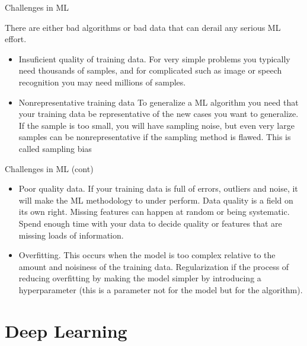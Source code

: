 \documentclass[11pt, aspectratio=43]{beamer}
\begin{document}
\begin{frame}{Challenges in ML}

	There are either bad algorithms or bad data that can derail any serious ML effort.
	\begin{itemize}
		\item Insuficient quality of training data.
		For very simple problems you typically need thousands of samples, and for complicated such as image or speech recognition you may need millions of samples.
		
		\item Nonrepresentative training data
		To generalize a ML algorithm you need that your training data be representative of the new cases you want to generalize. If the sample is too small, you will have sampling noise, but even very large samples can be nonrepresentative if the sampling method is flawed. This is called sampling bias
	\end{itemize}
	
\end{frame}

\begin{frame}{Challenges in ML (cont)}
	
	\begin{itemize}
		\item 	Poor quality data.
		If your training data is full of errors, outliers and noise, it will make the ML methodology to under perform. Data quality is a field on its own right. Missing features can happen at random or being systematic. Spend enough time with your data to decide quality or features that are missing loads of information.
		\item Overfitting.
		This occurs when the model is too complex relative to the amount and noisiness of the training data. Regularization if the process of reducing overfitting by making the model simpler by introducing a hyperparameter (this is a parameter not for the model but for the algorithm).
	\end{itemize}
	
\end{frame}

\section{Deep Learning}
\end{document}
